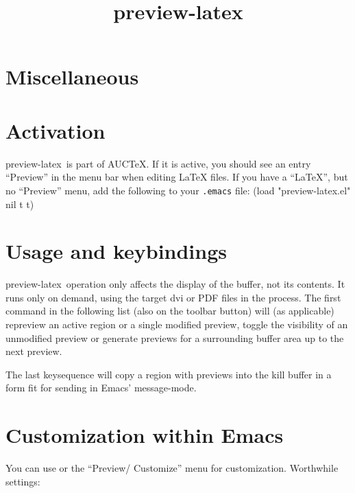 \section{Miscellaneous}


\newcolumn

\def\previewlatex{{preview-latex}}
\title{\previewlatex}
\section{Activation}
\previewlatex\ is part of AUC\TeX.  If it is active, you should see an
entry ``Preview'' in the menu bar when editing \LaTeX{} files.  If you
have a ``LaTeX'', but no ``Preview'' menu, add the following to your
{\tt .emacs} file:
\beginexample
(load "preview-latex.el" nil t t)
\endexample

\section{Usage and keybindings}
\previewlatex\ operation only affects the display of the buffer, not
its contents.  It runs only on demand, using the target {\sc dvi} or
{\sc PDF} files in the process.  The first command in the following
list (also on the toolbar button) will (as applicable) repreview an
active region or a single modified preview, toggle the visibility of
an unmodified preview or generate previews for a surrounding buffer
area up to the next preview.


The last keysequence will copy a region with previews into the kill
buffer in a form fit for sending in Emacs' message-mode.

\section{Customization within Emacs}

You can use  or the ``Preview\slash
Customize'' menu for customization.  Worthwhile settings:

